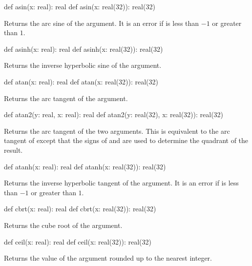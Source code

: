 \begin{protohead}
def asin(x: real): real
def asin(x: real(32)): real(32)
\end{protohead}
\begin{protobody}
Returns the arc sine of the argument.  It is an error if  is
less than $-1$ or greater than $1$.
\end{protobody}

\begin{protohead}
def asinh(x: real): real
def asinh(x: real(32)): real(32)
\end{protohead}
\begin{protobody}
Returns the inverse hyperbolic sine of the argument.
\end{protobody}

\begin{protohead}
def atan(x: real): real
def atan(x: real(32)): real(32)
\end{protohead}
\begin{protobody}
Returns the arc tangent of the argument.
\end{protobody}

\begin{protohead}
def atan2(y: real, x: real): real
def atan2(y: real(32), x: real(32)): real(32)
\end{protohead}
\begin{protobody}
Returns the arc tangent of the two arguments.  This is equivalent to
the arc tangent of  except that the signs of 
and  are used to determine the quadrant of the result.
\end{protobody}

\begin{protohead}
def atanh(x: real): real
def atanh(x: real(32)): real(32)
\end{protohead}
\begin{protobody}
Returns the inverse hyperbolic tangent of the argument.  It is an error
if  is less than $-1$ or greater than $1$.
\end{protobody}

\begin{protohead}
def cbrt(x: real): real
def cbrt(x: real(32)): real(32)
\end{protohead}
\begin{protobody}
Returns the cube root of the argument.
\end{protobody}

\begin{protohead}
def ceil(x: real): real
def ceil(x: real(32)): real(32)
\end{protohead}
\begin{protobody}
Returns the value of the argument rounded up to the nearest integer.
\end{protobody}

